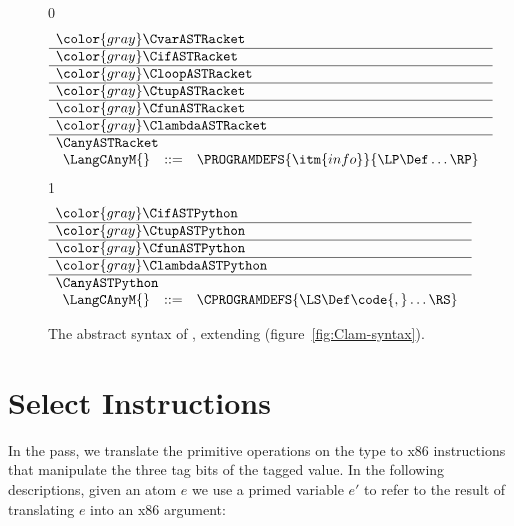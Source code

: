 \documentclass[7x10]{TimesAPriori_MIT}%
\newcommand{\gray}[1]{{\color{gray} #1}}
\def\racketEd{0}
\def\pythonEd{1}
\providecommand{\BookEdition}{1}
\let\edition\BookEdition
\newcommand{\pythonColor}[0]{}
\numberwithin{theorem}{chapter}
\numberwithin{definition}{chapter}
\numberwithin{equation}{chapter}
\begin{document}
\begin{figure}[tp]
  \begin{tcolorbox}[colback=white]
\small
{\if\edition\racketEd
\[
\begin{array}{l}
  \gray{\CvarASTRacket} \\ \hline
  \gray{\CifASTRacket} \\ \hline
  \gray{\CloopASTRacket} \\ \hline
  \gray{\CtupASTRacket} \\ \hline
  \gray{\CfunASTRacket} \\ \hline
  \gray{\ClambdaASTRacket} \\ \hline
  \CanyASTRacket \\
\begin{array}{lcl}
\LangCAnyM{} & ::= & \PROGRAMDEFS{\itm{info}}{\LP\Def\ldots\RP}
\end{array}
\end{array}
\]
\fi}
{\if\edition\pythonEd\pythonColor
\[
  \begin{array}{l}
  \gray{\CifASTPython} \\ \hline
  \gray{\CtupASTPython} \\ \hline
  \gray{\CfunASTPython} \\ \hline
  \gray{\ClambdaASTPython} \\ \hline
  \CanyASTPython \\
  \begin{array}{lcl}
    \LangCAnyM{} & ::= & \CPROGRAMDEFS{\LS\Def\code{,}\ldots\RS} 
  \end{array}
  \end{array}
\]
\fi}
  \end{tcolorbox}

\caption{The abstract syntax of \LangCAny{}, extending \LangCLam{} (figure~\ref{fig:Clam-syntax}).}
\label{fig:c5-syntax}
\end{figure}


\section{Select Instructions}
\label{sec:select-Lany}

In the  pass, we translate the primitive
operations on the \ANYTY{} type to x86 instructions that manipulate
the three tag bits of the tagged value. In the following descriptions,
given an atom $e$ we use a primed variable $e'$ to refer to the result
of translating $e$ into an x86 argument:
\end{document}
